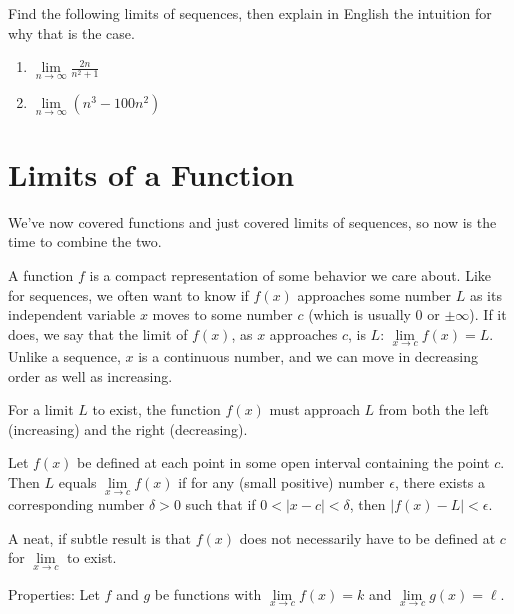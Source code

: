 \documentclass[]{book}
\providecommand{\tightlist}{%
  \setlength{\itemsep}{0pt}\setlength{\parskip}{0pt}}
\theoremstyle{definition}
\theoremstyle{definition}
\theoremstyle{definition}
\theoremstyle{remark}
\let\BeginKnitrBlock\begin \let\EndKnitrBlock\end
\begin{document}
\BeginKnitrBlock{exercise}
\protect\hypertarget{exr:limseq2}{}{\label{exr:limseq2} }Find the following
limits of sequences, then explain in English the intuition for why that
is the case.

\begin{enumerate}
\def\labelenumi{\arabic{enumi}.}
\tightlist
\item
  \(\lim\limits_{n\to\infty} \frac{2n}{n^2 + 1}\)
\item
  \(\lim\limits_{n\to\infty} (n^3 - 100n^2)\)
\end{enumerate}
\EndKnitrBlock{exercise}

\section{Limits of a Function}\label{limitsfun}

We've now covered functions and just covered limits of sequences, so now
is the time to combine the two.

A function \(f\) is a compact representation of some behavior we care
about. Like for sequences, we often want to know if \(f(x)\) approaches
some number \(L\) as its independent variable \(x\) moves to some number
\(c\) (which is usually 0 or \(\pm\infty\)). If it does, we say that the
limit of \(f(x)\), as \(x\) approaches \(c\), is \(L\):
\(\lim\limits_{x \to c} f(x)=L\). Unlike a sequence, \(x\) is a
continuous number, and we can move in decreasing order as well as
increasing.

For a limit \(L\) to exist, the function \(f(x)\) must approach \(L\)
from both the left (increasing) and the right (decreasing).

\BeginKnitrBlock{definition}[Limit of a function]
\protect\hypertarget{def:unnamed-chunk-5}{}{\label{def:unnamed-chunk-5}
{} }Let \(f(x)\) be defined at each
point in some open interval containing the point \(c\). Then \(L\)
equals \(\lim\limits_{x \to c} f(x)\) if for any (small positive) number
\(\epsilon\), there exists a corresponding number \(\delta>0\) such that
if \(0<|x-c|<\delta\), then \(|f(x)-L|<\epsilon\).
\EndKnitrBlock{definition}

A neat, if subtle result is that \(f(x)\) does not necessarily have to
be defined at \(c\) for \(\lim\limits_{x \to c}\) to exist.

Properties: Let \(f\) and \(g\) be functions with
\(\lim\limits_{x \to c} f(x)=k\) and
\(\lim\limits_{x \to c} g(x)=\ell\).
\end{document}
